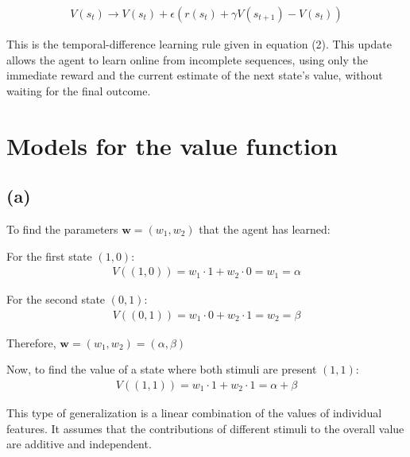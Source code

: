 \documentclass{article}
\begin{document}
\begin{align}
V(s_t) \rightarrow V(s_t) + \epsilon\left(r(s_t) + \gamma V(s_{t+1}) - V(s_t)\right)
\end{align}

This is the temporal-difference learning rule given in equation (2). This update allows the agent to learn online from incomplete sequences, using only the immediate reward and the current estimate of the next state's value, without waiting for the final outcome.


\section{Models for the value function}


\subsection*{(a)}


To find the parameters $\mathbf{w} = (w_1, w_2)$ that the agent has learned:

For the first state $(1,0)$:
\begin{align}
    V((1,0)) = w_1 \cdot 1 + w_2 \cdot 0 = w_1 = \alpha
\end{align}

For the second state $(0,1)$:
\begin{align}
    V((0,1)) = w_1 \cdot 0 + w_2 \cdot 1 = w_2 = \beta
\end{align}

Therefore, $\mathbf{w} = (w_1, w_2) = (\alpha, \beta)$

Now, to find the value of a state where both stimuli are present $(1,1)$:
\begin{align}
    V((1,1)) = w_1 \cdot 1 + w_2 \cdot 1 = \alpha + \beta
\end{align}

This type of generalization is a linear combination of the values of individual features. It assumes that the contributions of different stimuli to the overall value are additive and independent.

\end{document}
